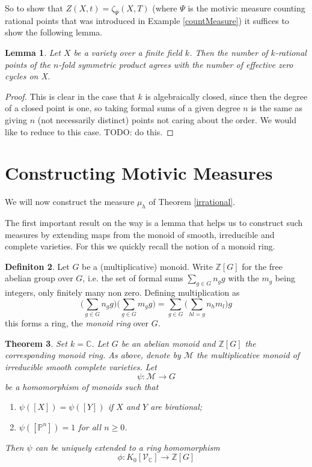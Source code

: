 \documentclass[11pt, a4paper, german]{article}
\theoremstyle{plain}
\newtheorem{theorem}{Theorem}[section]
\newtheorem{lemma}[theorem]{Lemma}
\theoremstyle{definition}
\newtheorem{definition}[theorem]{Definiton}
\newcommand{\gring}[1][k]{K_0[\mathcal{V}_#1]}
\begin{document}
So to show that $Z(X,t) = \zeta_{\Psi}(X,T)$ 
(where $\Psi$ is the motivic measure counting rational points that was introduced in Example \ref{countMeasure}) 
it suffices to show the following lemma.

\begin{lemma}
    Let $X$ be a variety over a finite field $k$. Then the number of $k$-rational points of the $n$-fold symmetric product agrees
    with the number of effective zero cycles on X.
\end{lemma}
\begin{proof}
    This is clear in the case that $k$ is algebraically closed, since then the degree of a closed point is one, so taking formal sums of
    a given degree $n$ is the same as giving $n$ (not necessarily distinct) points not caring about the order.
    We would like to reduce to this case. TODO: do this.
\end{proof}

\section{Constructing Motivic Measures}
\label{const}
We will now construct the measure $\mu_h$ of Theorem \ref{irrational}.

The first important result on the way is a lemma that helps us to construct such measures by extending maps from the monoid of smooth, irreducible
and complete varieties. For this we quickly recall the notion of a monoid ring.

\begin{definition}
    Let $G$ be a (multiplicative) monoid. Write $\mathbb{Z}[G]$ for the free abelian group over $G$, i.e. the set of formal sums
    $\sum_{g \in G} n_g g$ with the $m_g$ being integers, only finitely many non zero.
    Defining multiplication as
    \[
        \Big(\sum_{g \in G} n_g g\Big)\Big(\sum_{g \in G} m_g g \Big) = \sum_{g \in G} \Big(\sum_{hl = g} n_h m_l\Big) g
    \]
    this forms a ring, the \emph{monoid ring} over $G$.
\end{definition}

\begin{theorem}
    \label{th1}
    Set $k = \mathbb{C}$. Let $G$ be an abelian monoid and $\mathbb{Z}[G]$ the corresponding monoid ring. As above, denote
    by $\mathcal{M}$ the multiplicative monoid of irreducible smooth complete varieties. Let
    \[
        \psi \colon \mathcal{M} \to G
    \]
    be a homomorphism of monoids such that
    \begin{enumerate}[label=\rm{\roman*)}]
        \item $\psi([X]) = \psi([Y])$ if $X$ and $Y$ are birational;
        \item $\psi([\mathbb{P}^n]) = 1$ for all $n \ge 0$.
    \end{enumerate}
    Then $\psi$ can be uniquely extended to a ring homomorphism 
    \[
        \phi \colon \gring[\mathbb{C}] \to \mathbb{Z} [G]
    \]
\end{theorem}
\end{document}
